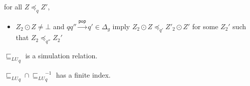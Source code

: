 \documentclass{llncs}
\newcommand{\pushact}{\mathsf{push}}
\newcommand{\popact}{\mathsf{pop}}
\begin{document}
\begin{lemma}

for all $Z\preceq_q Z'$,

\begin{itemize}
  \item $Z_2\odot Z\not=\bot$ and $qq''\xrightarrow{\popact}q'\in\Delta_g$
  imply $Z_2\odot Z\preceq_{q'}Z'_2\odot Z'$
  for some $Z_2'$ such that $Z_2\preceq_{q''} Z_2'$
\end{itemize}
\end{lemma}

\begin{lemma}
  ${\sqsubseteq_{LU}}_q$ is a simulation relation. 
\end{lemma}

\begin{lemma}
  ${\sqsubseteq_{LU}}_q\cap{\sqsubseteq_{LU}}_q^{-1}$ has a finite index.
\end{lemma}
\end{document}
